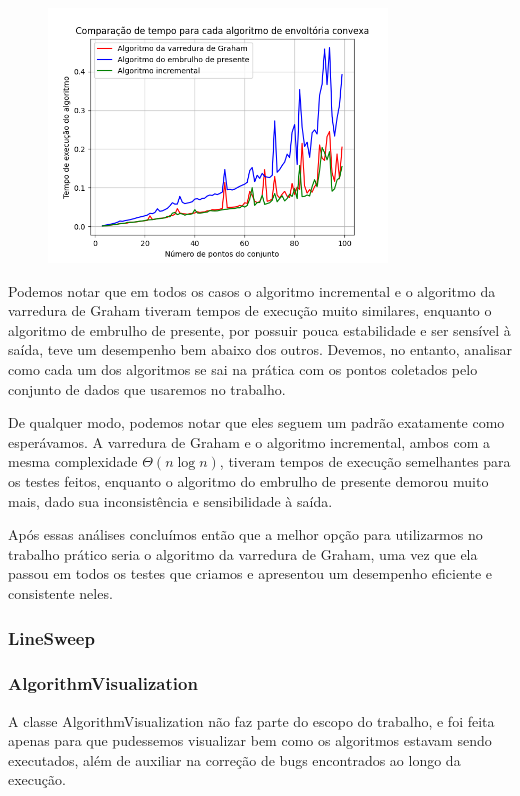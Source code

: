 \documentclass{article}
\begin{document}
\begin{figure} [H]
	\includegraphics[width=9cm]{normal.png}
	\centering
\end{figure}

Podemos notar que em todos os casos o algoritmo incremental e o algoritmo da varredura de Graham tiveram tempos de execução muito similares, enquanto o algoritmo de embrulho de presente, por possuir pouca estabilidade e ser sensível à saída, teve um desempenho bem abaixo dos outros. Devemos, no entanto, analisar como cada um dos algoritmos se sai na prática com os pontos coletados pelo conjunto de dados que usaremos no trabalho.

De qualquer modo, podemos notar que eles seguem um padrão exatamente como esperávamos. A varredura de Graham e o algoritmo incremental, ambos com a mesma complexidade \( \Theta(n \log n) \), tiveram tempos de execução semelhantes para os testes feitos, enquanto o algoritmo do embrulho de presente demorou muito mais, dado sua inconsistência e sensibilidade à saída.

Após essas análises concluímos então que a melhor opção para utilizarmos no trabalho prático seria o algoritmo da varredura de Graham, uma vez que ela passou em todos os testes que criamos e apresentou um desempenho eficiente e consistente neles.

\subsubsection{LineSweep}

\subsubsection{AlgorithmVisualization}

A classe AlgorithmVisualization não faz parte do escopo do trabalho, e foi feita apenas para que pudessemos visualizar bem como os algoritmos estavam sendo executados, além de auxiliar na correção de bugs encontrados ao longo da execução.
\end{document}
